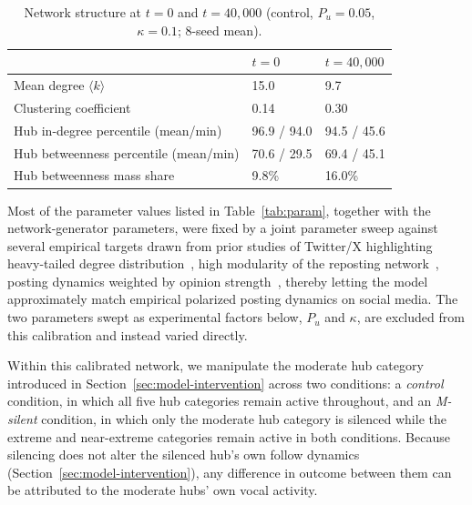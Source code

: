\documentclass{svproc}
\def\VCR{\kappa}                 %
\begin{document}
\begin{table}[t]
\centering
\caption{Network structure at $t=0$ and $t=40{,}000$ (control,
$P_u=0.05$, $\VCR=0.1$; 8-seed mean).}\label{tab:netstats}
\tabcolsep=5pt
\begin{tabular}{lll}
\toprule
 & $t=0$ & $t=40{,}000$ \\
\midrule
Mean degree $\langle k\rangle$ & 15.0 & 9.7 \\
Clustering coefficient & 0.14 & 0.30 \\
Hub in-degree percentile (mean/min) & 96.9 / 94.0 & 94.5 / 45.6 \\
Hub betweenness percentile (mean/min) & 70.6 / 29.5 & 69.4 / 45.1 \\
Hub betweenness mass share & 9.8\% & 16.0\% \\
\bottomrule
\end{tabular}
\end{table}

Most of the parameter values listed in
Table~\ref{tab:param}, together with the
network-generator parameters, were 
fixed by a joint parameter
sweep against several empirical targets drawn from
prior studies of Twitter/X
highlighting heavy-tailed degree distribution~\cite{kwak2010}, 
high modularity of the reposting network~\cite{conover2011}, 
posting dynamics weighted by opinion strength~\cite{buntain2025}, 
thereby letting the model approximately match empirical 
polarized posting dynamics on social media.
The two
parameters swept as experimental factors below,
$P_u$ and $\VCR$, are excluded from this
calibration and instead varied directly.

Within this calibrated network, 
we manipulate the moderate hub category
introduced in Section~\ref{sec:model-intervention}
across two conditions: a \emph{control} condition, in which
all five hub categories remain active throughout,
and an \emph{M-silent} condition, in which only the
moderate hub category is silenced while the
extreme and near-extreme categories remain active
in both conditions. Because silencing does not alter the
silenced hub's own follow dynamics
(Section~\ref{sec:model-intervention}), 
any difference in outcome between them can be
attributed to the moderate hubs' own vocal
activity.
\end{document}
